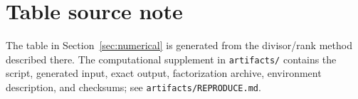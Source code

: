 \section*{Table source note}

The table in Section~\ref{sec:numerical} is generated from the divisor/rank
method described there. The computational supplement in \texttt{artifacts/}
contains the script, generated input, exact output, factorization archive,
environment description, and checksums; see \texttt{artifacts/REPRODUCE.md}.
